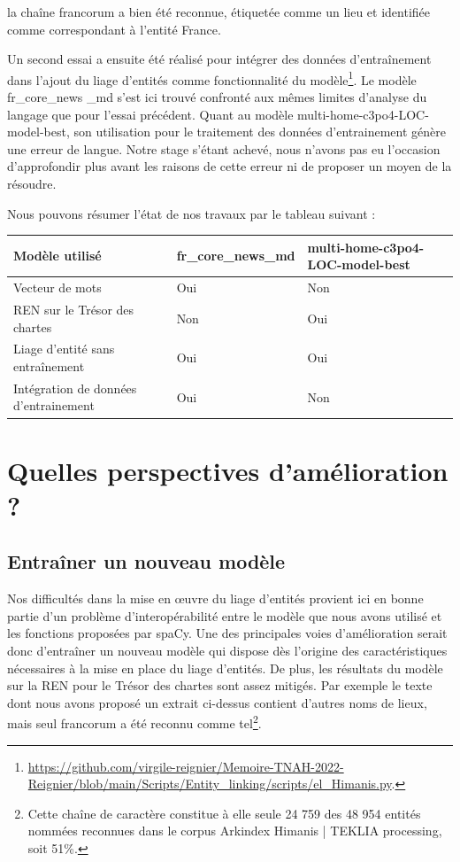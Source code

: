 \documentclass[a4paper,12pt,twoside]{book}
\begin{document}
	\noindent la chaîne \og francorum\fg{} a bien été reconnue, étiquetée comme un lieu et identifiée comme correspondant à l'entité France.
	
	Un second essai a ensuite été réalisé pour intégrer des données d'entraînement dans l'ajout du liage d'entités comme fonctionnalité du modèle\footnote{\url{https://github.com/virgile-reignier/Memoire-TNAH-2022-Reignier/blob/main/Scripts/Entity_linking/scripts/el_Himanis.py}.}. Le modèle \og fr\_core\_news \_md\fg{} s'est ici trouvé confronté aux mêmes limites d'analyse du langage que pour l'essai précédent. Quant au modèle \og multi-home-c3po4-LOC-model-best\fg{}, son utilisation pour le traitement des données d'entrainement génère une erreur de langue. Notre stage s'étant achevé, nous n'avons pas eu l'occasion d'approfondir plus avant les raisons de cette erreur ni de proposer un moyen de la résoudre. 
	
	\noindent Nous pouvons résumer l'état de nos travaux par le tableau suivant :
	
	\begin{center}
		\begin{tabular}{|p{7cm}|p{4cm}|p{4cm}|}
			\hline
			Modèle utilisé & fr\_core\_news\_md & multi-home-c3po4-LOC-model-best\\
			\hline
			Vecteur de mots & Oui & Non \\ \hline
			REN sur le Trésor des chartes & Non & Oui \\ \hline
			Liage d'entité sans entraînement & Oui & Oui \\ \hline
			Intégration de données d'entrainement & Oui & Non \\ \hline
		\end{tabular}
	\end{center}
	
	\section{Quelles perspectives d'amélioration ?}
	
	\subsection{Entraîner un nouveau modèle}
	
	Nos difficultés dans la mise en œuvre du liage d'entités provient ici en bonne partie d'un problème d'interopérabilité entre le modèle que nous avons utilisé et les fonctions proposées par spaCy. Une des principales voies d'amélioration serait donc d'entraîner un nouveau modèle qui dispose dès l'origine des caractéristiques nécessaires à la mise en place du liage d'entités. De plus, les résultats du modèle sur la REN pour le Trésor des chartes sont assez mitigés. Par exemple le texte dont nous avons proposé un extrait ci-dessus contient d'autres noms de lieux, mais seul \og francorum\fg{} a été reconnu comme tel\footnote{Cette chaîne de caractère constitue à elle seule 24 759 des 48 954 entités nommées reconnues dans le corpus Arkindex \og Himanis | TEKLIA processing\fg{}, soit 51\%.}.
	
\end{document}

